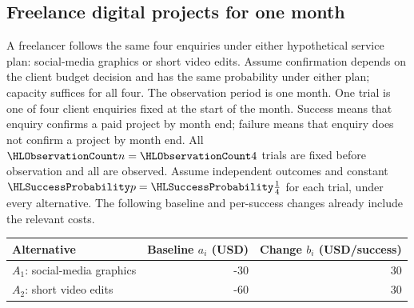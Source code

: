 \subsection{Freelance digital projects for one month}\label{prob:c4-energy}
A freelancer follows the same four enquiries under either hypothetical service plan: social-media graphics or short video edits. Assume confirmation depends on the client budget decision and has the same probability under either plan; capacity suffices for all four.
The observation period is one month. One trial is one of four client enquiries fixed at the start of the month.
Success means that enquiry confirms a paid project by month end; failure means that enquiry does not confirm a project by month end.
All $\TrialCount{n}=\TrialCount{4}$ trials are fixed before observation and all are observed. 
Assume independent outcomes and constant $\SuccessProb{p}=\SuccessProb{\frac{1}{4}}$ for each trial, under every alternative. 
The following baseline and per-success changes already include the relevant costs.
\begin{center}\begin{tabular}{lrr}\toprule Alternative & Baseline $a_i$ (USD) & Change $b_i$ (USD/success)\\\midrule
$A_1$: social-media graphics & -30 & 30\\
$A_2$: short video edits & -60 & 30\\
\bottomrule\end{tabular}\end{center}
